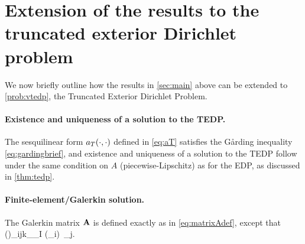     
\section{Extension of the results to the truncated exterior Dirichlet problem}\label{sec:TEDP}

We now briefly outline how the results in \cref{sec:main} above can be extended to \cref{prob:vtedp}, the Truncated Exterior Dirichlet Problem.



\paragraph{Existence and uniqueness of a solution to the TEDP.} The sesquilinear form $a_{T}(\cdot,\cdot)$ defined in \cref{eq:aT} satisfies the G\aa rding inequality \cref{eq:gardingbrief}, and existence and uniqueness of a solution to the TEDP follow under the same condition on $A$ (piecewise-Lipschitz) as for the EDP, as discussed in \cref{thm:tedp}.%

\paragraph{Finite-element/Galerkin solution.}
The Galerkin matrix $\mathbf{A}$ is defined exactly as in \cref{eq:matrixAdef}, except that 
\beq\label{eq:NTEDP}
\big(\Nmat\big)_{ij}\de \ri k\int_{\Gamma_I}  (\gamma\phi_i) \,\gamma \phi_j.
\eeq

